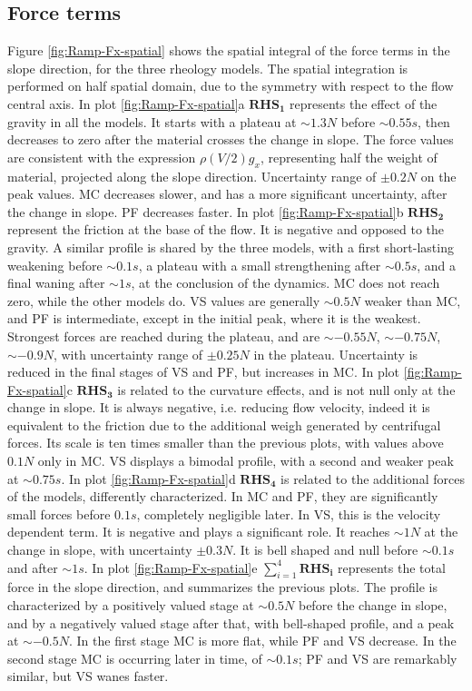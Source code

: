 \documentclass{article}
\begin{document}
\subsection{Force terms}
Figure \ref{fig:Ramp-Fx-spatial} shows the spatial integral of the force terms in the slope direction, for the three rheology models. The spatial integration is performed on half spatial domain, due to the symmetry with respect to the flow central axis. In plot \ref{fig:Ramp-Fx-spatial}a $\boldsymbol{RHS_1}$ represents the effect of the gravity in all the models. It starts with a plateau at $\sim 1.3 N$ before $\sim 0.55 s$, then decreases to zero after the material crosses the change in slope. The force values are consistent with the expression $\rho \left(V/2\right) g_x$, representing half the weight of material, projected along the slope direction. Uncertainty range of $\pm 0.2 N$ on the peak values. MC decreases slower, and has a more significant uncertainty, after the change in slope. PF decreases faster. In plot \ref{fig:Ramp-Fx-spatial}b $\boldsymbol{RHS_2}$ represent the friction at the base of the flow. It is negative and opposed to the gravity. A similar profile is shared by the three models, with a first short-lasting weakening before $\sim 0.1 s$, a plateau with a small strengthening after $\sim 0.5 s$, and a final waning after $\sim 1 s$, at the conclusion of the dynamics. MC does not reach zero, while the other models do. VS values are generally $\sim 0.5 N$ weaker than MC, and PF is intermediate, except in the initial peak, where it is the weakest. Strongest forces are reached during the plateau, and are $\sim -0.55 N$, $\sim -0.75 N$, $\sim -0.9 N$, with uncertainty range of $\pm 0.25 N$ in the plateau. Uncertainty is reduced in the final stages of VS and PF, but increases in MC. In plot \ref{fig:Ramp-Fx-spatial}c $\boldsymbol{RHS_3}$ is related to the curvature effects, and is not null only at the change in slope. It is always negative, i.e. reducing flow velocity, indeed it is equivalent to the friction due to the additional weigh generated by centrifugal forces. Its scale is ten times smaller than the previous plots, with values above $0.1 N$ only in MC. VS displays a bimodal profile, with a second and weaker peak at $\sim 0.75 s$. In plot \ref{fig:Ramp-Fx-spatial}d $\boldsymbol{RHS_4}$ is related to the additional forces of the models, differently characterized. In MC and PF, they are significantly small forces before $0.1 s$, completely negligible later. In VS, this is the velocity dependent term. It is negative and plays a significant role. It reaches $\sim 1 N$ at the change in slope, with uncertainty $\pm 0.3 N$. It is bell shaped and null before $\sim 0.1 s$ and after $\sim 1 s$. In plot \ref{fig:Ramp-Fx-spatial}e $\sum^4_{i=1}\boldsymbol{RHS_i}$ represents the total force in the slope direction, and summarizes the previous plots. The profile is characterized by a positively valued stage at $\sim 0.5 N$ before the change in slope, and by a negatively valued stage after that, with bell-shaped profile, and a peak at $\sim -0.5 N$. In the first stage MC is more flat, while PF and VS decrease. In the second stage MC is occurring later in time, of $\sim 0.1 s$; PF and VS are remarkably similar, but VS wanes faster.
\end{document}
